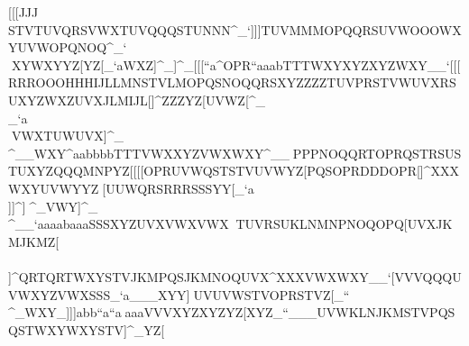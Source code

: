                                                             [[[JJJ^^`STVTUVQRSVWXTUVQQQSTUNNN^_`                                                            ]]]TUVMMMOPQQRSUVWOOOWXYUVWOPQNOQ^_`                                                            \\\Z[\XYZ]^^WXYWXYYZ[YZ[_`aWXZ]^_]^_                                                            [[[``a\]^OPR``aaabTTTWXYXYZXYZWXY__`                                                            [[[RRROOOHHHIJLLMNSTVLMOPQSNOQQRSXYZ                                                            ZZZTUVPRSTVWUVXRSUXYZWXZUVXJLMIJL[]^                                                            ZZZYZ[UVWZ[\Z[\STUTUVTTVTUVPPPRST^_`                                                            [[[VWXJKMKLNUVWTUVWXZYZ[TUV[\]ZZ[_`a                                                            \\\_`a``aUVWVWXQRTQRTLLLQRSNNNQRS]^_                                                            \\\MMMCCCJJJTUVWXYQQQUVWSTUQRTOPR_`a                                                            \\\STUQRSTUVJJJVWXUVW^^_VWXTUWUVX]^_                                                            \\\^__WXY\]^aabbbbTTTVWXXYZVWXWXY^__                                                            ^^^PPPNOQQRTOPRQSTRSUSTUXYZQQQMNPYZ[                                                            [[[OPRUVWQSTSTVUVWYZ[PQSOPRDDDOPR[]^                                                            XXXWXYUVWYYZ^^_[\]UUWQRSRRRSSSYY[_`a                                                            \\]]\]^]^^[\][\][\]^_`^^_XYZ]^_VWY]^_                                                            \\\QRT^__`aaaabaaaSSSXYZUVXVWXVWX^^_                                                            ^^^TUVRSUKLNMNPNOQOPQ[\]UVXJKMJKMZ[\                                                            \\\\]^QRTQRTWXYSTVJKMPQSJKMNOQUVX\]^                                                            XXXVWXWXY__`[\]VVVQQQUVWXYZVWXSSS_`a                                                            ___XYY]^^TUVUVWSTVOPRSTVZ[\UVXWXZ_``                                                            \\\YZ[OPQNNNQRTRSTSTUVWXTUVRSTWXY_`a                                                            ^^^SSSSSSLLL[\]TUVTUVVWXNNNVWXOOO_`a                                                            \\\Z[\[\]YZ[YZ[[\][\]WXYYZ[]^_WXY\]_                                                            ]]]abb``a``a^^_aaaVVVXYZXYZYZ[XYZ_``                                                            ___UVWKLNJKMSTVPQSQSTWXYWXYSTV]^_YZ[              